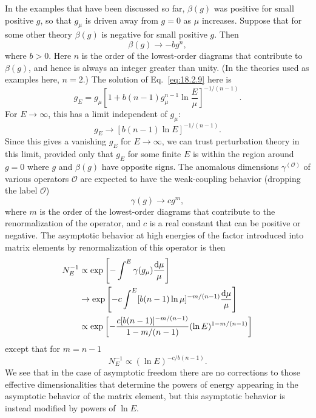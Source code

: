 In the examples that have been discussed so far, $\beta(g)$ was positive for
small positive $g$, so that $g_\mu$ is driven away from $g=0$ as $\mu$ increases.
Suppose that for some other theory $\beta(g)$ is negative for small positive $g$.
Then
\begin{equation}
\beta(g)\to-bg^n,
\label{eq:18.3.16}
\end{equation}
where $b>0$. Here $n$ is the order of the lowest-order diagrams that
contribute to $\beta(g)$, and hence is always an integer greater than unity. (In
the theories used as examples here, $n=2$.) The solution of Eq.\ \eqref{eq:18.2.9}
here is
\begin{equation}
g_E=g_\mu\left[1+b(n-1)g_\mu^{n-1}\ln\frac{E}{\mu}\right]^{-1/(n-1)}.
\label{eq:18.3.17}
\end{equation}
For $E\to\infty$, this has a limit independent of $g_\mu$:
\begin{equation}
g_E\to[b(n-1)\ln E]^{-1/(n-1)}.
\label{eq:18.3.18}
\end{equation}
Since this gives a vanishing $g_E$ for $E\to\infty$, we can trust perturbation
theory in this limit, provided only that $g_E$ for some finite $E$ is within
the region around $g=0$ where $g$ and $\beta(g)$ have opposite signs. The
anomalous dimensions $\gamma^{(\mathcal O)}$ of various operators $\mathcal O$ are expected to have
the weak-coupling behavior (dropping the label $\mathcal O$)
\begin{equation}
\gamma(g)\to cg^m,
\label{eq:18.3.19}
\end{equation}
where $m$ is the order of the lowest-order diagrams that contribute to
the renormalization of the operator, and $c$ is a real constant that can
be positive or negative. The asymptotic behavior at high energies of the
factor introduced into matrix elements by renormalization of this operator
is then
\begin{align}
N_E^{-1}
&\propto\exp\left[-\int^E\gamma(g_\mu)\frac{\mathop{}\!\mathrm{d}\mu}{\mu}\right] \notag\\
&\to\exp\left[-c\int^E[b(n-1)\ln\mu]^{-m/(n-1)}\frac{\mathop{}\!\mathrm{d}\mu}{\mu}\right] \notag\\
&\propto\exp\left[-\frac{c[b(n-1)]^{-m/(n-1)}}{1-m/(n-1)}
(\ln E)^{1-m/(n-1)}\right]
\label{eq:18.3.20}
\end{align}
except that for $m=n-1$
\begin{equation}
N_E^{-1}\propto(\ln E)^{-c/b(n-1)}.
\label{eq:18.3.21}
\end{equation}
We see that in the case of asymptotic freedom there are no corrections
to those effective dimensionalities that determine the powers of energy
appearing in the asymptotic behavior of the matrix element, but this
asymptotic behavior is instead modified by powers of $\ln E$.

